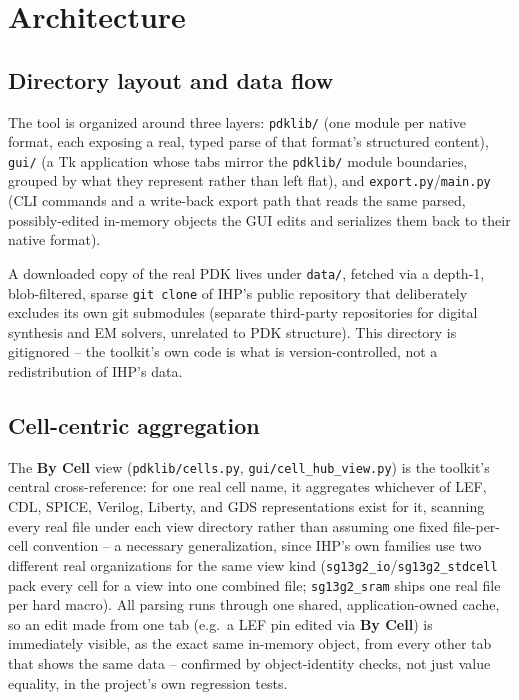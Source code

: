 \documentclass[a4paper,11pt]{article}
\begin{document}
\section{Architecture}

\subsection{Directory layout and data flow}

The tool is organized around three layers: \texttt{pdklib/} (one module
per native format, each exposing a real, typed parse of that
format's structured content), \texttt{gui/} (a Tk application whose
tabs mirror the \texttt{pdklib/} module boundaries, grouped by what they
represent rather than left flat), and \texttt{export.py}/\texttt{main.py}
(CLI commands and a write-back export path that reads the same
parsed, possibly-edited in-memory objects the GUI edits and
serializes them back to their native format).

A downloaded copy of the real PDK lives under \texttt{data/}, fetched
via a depth-1, blob-filtered, sparse \texttt{git clone} of
IHP's public repository that deliberately excludes its own git
submodules (separate third-party repositories for digital synthesis
and EM solvers, unrelated to PDK structure). This directory is
gitignored -- the toolkit's own code is what is version-controlled,
not a redistribution of IHP's data.

\subsection{Cell-centric aggregation}

The \textbf{By Cell} view (\texttt{pdklib/cells.py}, \texttt{gui/cell\_hub\_view.py})
is the toolkit's central cross-reference: for one real cell name, it
aggregates whichever of LEF, CDL, SPICE, Verilog, Liberty, and GDS
representations exist for it, scanning every real file under each
view directory rather than assuming one fixed file-per-cell
convention -- a necessary generalization, since IHP's own families
use two different real organizations for the same view kind
(\texttt{sg13g2\_io}/\texttt{sg13g2\_stdcell} pack every cell for a
view into one combined file; \texttt{sg13g2\_sram} ships one real
file per hard macro). All parsing runs through one shared,
application-owned cache, so an edit made from one tab (e.g.\ a LEF
pin edited via \textbf{By Cell}) is immediately visible, as the exact
same in-memory object, from every other tab that shows the same
data -- confirmed by object-identity checks, not just value equality,
in the project's own regression tests.
\end{document}
